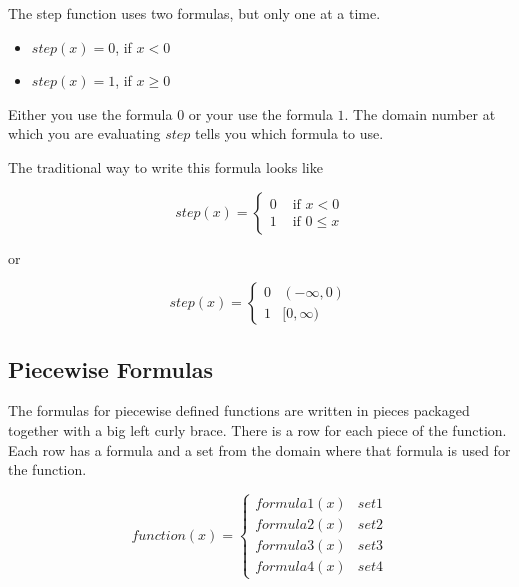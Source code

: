 \documentclass{ximera}
\begin{document}
The step function uses two formulas, but only one at a time.  

\begin{itemize}
\item $step(x) = 0$, if $x < 0$ 
\item $step(x) = 1$, if $x \geq 0$
\end{itemize}  


Either you use the formula $0$ or your use the formula $1$.  The domain number at which you are evaluating $step$ tells you which formula to use.


The traditional way to write this formula looks like

\[
step(x) = 
\begin{cases}
  0 & \text{ if } x < 0 \\
  1 & \text{ if } 0 \leq x
\end{cases}
\]


or


\[
step(x) = 
\begin{cases}
  0 & (-\infty, 0) \\
  1 & [0, \infty)
\end{cases}
\]






















\subsection*{Piecewise Formulas}



The formulas for piecewise defined functions are written in pieces packaged together with a big left curly brace.  There is a row for each piece of the function.  Each row has a formula and a set from the domain where that formula is used for the function.





\[
function(x) = 
\begin{cases}
  formula1(x) & set1 \\
  formula2(x) & set2 \\
  formula3(x) & set3 \\
  formula4(x) & set4
\end{cases}
\]
\end{document}
